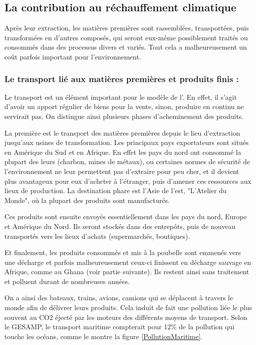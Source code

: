 \subsection{La contribution au réchauffement climatique}


Après leur extraction, les matières premières sont rassemblées, transportées, puis transformées en d'autres composés, qui seront eux-même possiblement traités ou consommés dans des processus divers et variés. Tout cela a malheureusement un coût parfois important pour l'environnement.


\subsubsection{Le transport lié aux matières premières et produits finis : }
Le transport est un élément important pour le modèle de l'\op. En effet, il s'agit d'avoir un apport régulier de biens pour la vente, sinon, produire en continu ne servirait pas. On distingue ainsi plusieurs phases d'acheminement des produits.

La première est le transport des matières premières depuis le lieu d'extraction jusqu'aux usines de transformation. Les principaux pays exportateurs sont situés en Amérique du Sud et en Afrique. En effet les pays du nord ont consommé la plupart des leurs (charbon, mines de métaux), ou certaines normes de sécurité de l'environnement ne leur permettent pas d'extraire pour peu cher, et il devient plus avantageux pour eux d'acheter à l'étranger, puis d'amener ces ressources aux lieux de production. La destination phare est l'Asie de l'est, "L'Atelier du Monde", où la plupart des produits sont manufacturés.

Ces produits sont ensuite envoyés essentiellement dans les pays du nord, Europe et Amérique du Nord. Ils seront stockés dans des entrepôts, puis de nouveau transportés vers les lieux d'achats (supermarchés, boutiques). 

Et finalement, les produits consommés et mis à la poubelle sont emmenés vers une décharge et parfois malheureusement ceux-ci finissent en décharge sauvage en Afrique, comme au Ghana (voir partie suivante). Ils restent ainsi sans traitement et polluent durant de nombreuses années.

On a ainsi des bateaux, trains, avions, camions qui se déplacent à travers le monde afin de délivrer leurs produits. Cela induit de fait une pollution liée le plus souvent au CO2 éjecté par les moteurs des différents moyens de transport. Selon le GESAMP, le transport maritime compterait pour 12\% de la pollution qui touche les océans, comme le montre la figure \ref{PollutionMaritime}.


